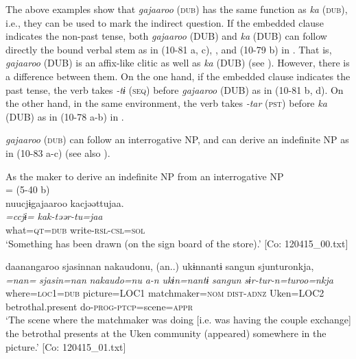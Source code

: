 The above examples show that \textit{gajaaroo} (\textsc{dub}) has the same function as \textit{ka} (\textsc{dub}), i.e., they can be used to mark the indirect question. If the embedded clause indicates the non-past tense, both \textit{gajaaroo} (DUB) and \textit{ka} (DUB) can follow directly the bound verbal stem as in (10-81 a, c), , and (10-79 b) in . That is, \textit{gajaaroo} (DUB) is an affix-like clitic as well as \textit{ka} (DUB) (see ). However, there is a difference between them. On the one hand, if the embedded clause indicates the past tense, the verb takes \textit{{}-tɨ} (\textsc{seq}) before \textit{gajaaroo} (DUB) as in (10-81 b, d). On the other hand, in the same environment, the verb takes \textit{{}-tar} (\textsc{pst}) before \textit{ka} (DUB) as in (10-78 a-b) in .

  \textit{gajaaroo} (\textsc{dub}) can follow an interrogative NP, and can derive an indefinite NP as in (10-83 a-c) (see also ).

\ea\label{ex:10.83}   As the maker to derive an indefinite NP from an interrogative NP\\
  \ea{} = (5-40 b)\\
      \glll    nuucjɨgajaaroo  kacjəəttujaa.\\
      \textit{=ccjɨ=}  \textit{kak-təər-tu=jaa}\\
      what=\textsc{qt}=\textsc{dub}  write-\textsc{rsl}-\textsc{csl}=\textsc{sol}\\
      \glt       ‘Something has been drawn (on the sign board of the store).’ [Co: 120415\_00.txt]

  \ex  %
      \glll    daanangaroo  sjasinnan  {\textbar}nakaudo{\textbar}nu,  (an..)  ukɨnnantɨ  sangun  sjunturonkja,\\
      \textit{=nan=}  \textit{sjasin=nan}  \textit{nakaudo=nu}  \textit{a-n}  \textit{ukɨn=nantɨ}  \textit{sangun}  \textit{sɨr-tur-n=turoo=nkja}\\
      where=\textsc{loc}1=\textsc{dub}  picture=LOC1  matchmaker=\textsc{nom}  \textsc{dist}-\textsc{adnz}  Uken=LOC2  betrothal.present  do-\textsc{prog}-\textsc{ptcp}=scene=\textsc{appr}\\
      \glt       ‘The scene where the matchmaker was doing [i.e. was having the couple exchange] the betrothal presents at the Uken community (appeared) somewhere in the picture.’ [Co: 120415\_01.txt]

